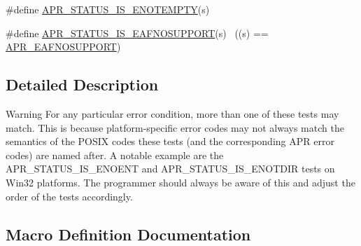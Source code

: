 \begin{DoxyCompactItemize}
\item 
\#define \hyperlink{group___a_p_r___s_t_a_t_u_s___i_s_gabe21b829c647616e0809613b7bd38ce3}{A\+P\+R\+\_\+\+S\+T\+A\+T\+U\+S\+\_\+\+I\+S\+\_\+\+E\+N\+O\+T\+E\+M\+P\+TY}(s)          
\item 
\#define \hyperlink{group___a_p_r___s_t_a_t_u_s___i_s_gafe99a5411377be6f2a8ea21196d7cb5d}{A\+P\+R\+\_\+\+S\+T\+A\+T\+U\+S\+\_\+\+I\+S\+\_\+\+E\+A\+F\+N\+O\+S\+U\+P\+P\+O\+RT}(s)    ~((s) == \hyperlink{group___a_p_r___error_ga76b558840838bcb94a4811a8e52df7a6}{A\+P\+R\+\_\+\+E\+A\+F\+N\+O\+S\+U\+P\+P\+O\+RT})
\end{DoxyCompactItemize}


\subsection{Detailed Description}
\begin{DoxyWarning}{Warning}
For any particular error condition, more than one of these tests may match. This is because platform-\/specific error codes may not always match the semantics of the P\+O\+S\+IX codes these tests (and the corresponding A\+PR error codes) are named after. A notable example are the A\+P\+R\+\_\+\+S\+T\+A\+T\+U\+S\+\_\+\+I\+S\+\_\+\+E\+N\+O\+E\+NT and A\+P\+R\+\_\+\+S\+T\+A\+T\+U\+S\+\_\+\+I\+S\+\_\+\+E\+N\+O\+T\+D\+IR tests on Win32 platforms. The programmer should always be aware of this and adjust the order of the tests accordingly. 
\end{DoxyWarning}


\subsection{Macro Definition Documentation}
